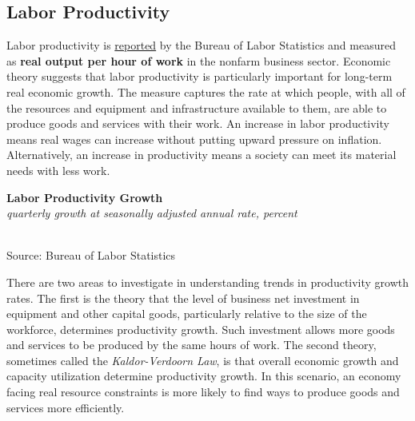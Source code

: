 \documentclass{report}
\makeatletter
\newcommand{\tbllink}[1]{\href{https://raw.githubusercontent.com/bdecon/US-chartbook/master/chartbook/data/#1}{\faTable}}
\newcommand*\short[1]{\expandafter\@gobbletwo\number\numexpr#1\relax}
\newcommand{\sbar}[4]{
		\addplot[ybar stacked, bar width=2.4pt, draw opacity=0, fill=#1] 
			table [x=#2, y=#3, col sep=comma]{#4};}
\newcommand{\dateaxisticks}{
		date coordinates in=x, axis line style={draw=none},
		xmax={2022-01-30},
		max space between ticks=40,	    
		xtick={{1990-01-01}, {1992-01-01}, {1994-01-01}, 
			{1996-01-01}, {1998-01-01}, {2000-01-01}, 
			{2002-01-01}, {2004-01-01}, {2006-01-01},
			{2008-01-01}, {2010-01-01}, {2012-01-01}, {2014-01-01},
		    {2016-01-01}, {2018-01-01}, {2020-01-01}, {2022-01-01}},
		minor xtick={{1989-01-01}, {1991-01-01}, {1993-01-01},
			{1995-01-01}, {1997-01-01}, {1999-01-01}, 
			{2001-01-01}, {2003-01-01}, {2005-01-01}, {2007-01-01},
		    {2009-01-01}, {2011-01-01}, {2013-01-01}, {2015-01-01},
		    {2017-01-01}, {2019-01-01}, {2021-01-01}},
		enlarge y limits={0.06}, enlarge x limits={0.01},
		}
\newcommand{\bbar}[2]{extra #1 ticks = {{#2}}, extra #1 tick labels = ,
		extra #1 tick style = {grid=major, grid style={thick, black!25}},}
\newcommand{\rbars}{
		\fill[color=black!10] (axis cs:{1990-07-01},\pgfkeysvalueof{/pgfplots/ymin}) rectangle 
			(axis cs:{1991-03-01}, \pgfkeysvalueof{/pgfplots/ymax});
		\fill[color=black!10] (axis cs:{2007-12-01},\pgfkeysvalueof{/pgfplots/ymin}) rectangle 
			(axis cs:{2009-07-01}, \pgfkeysvalueof{/pgfplots/ymax});
		\fill[color=black!10] (axis cs:{2001-03-01},\pgfkeysvalueof{/pgfplots/ymin}) rectangle 
			(axis cs:{2001-11-01}, \pgfkeysvalueof{/pgfplots/ymax});
		\fill[color=black!10] (axis cs:{2020-02-01},\pgfkeysvalueof{/pgfplots/ymin}) rectangle 
			(axis cs:{2020-05-01}, \pgfkeysvalueof{/pgfplots/ymax});}
\makeatother
\begin{document}
{{\begin{minipage}{0.76\textwidth}
\subsection*{\color{black!70} \seriffont Labor Productivity}
\small Labor productivity is \href{https://www.bls.gov/news.release/prod2.nr0.htm}{reported} by the Bureau of Labor Statistics and measured as \textbf{real output per hour of work} in the nonfarm business sector. Economic theory suggests that labor productivity is particularly important for long-term real economic growth. The measure captures the rate at which people, with all of the resources and equipment and infrastructure available to them, are able to produce goods and services with their work. An increase in labor productivity means real wages can increase without putting upward pressure on inflation. Alternatively, an increase in productivity means a society can meet its material needs with less work.


\vspace{3mm}

\normalsize \textbf{Labor Productivity Growth}\\
\footnotesize{\textit{quarterly growth at seasonally adjusted annual rate, percent}}\\
\hspace*{-2mm} \\
\footnotesize{Source: Bureau of Labor Statistics} \hfill \tbllink{lprod.csv}
\vspace{3mm}

\small There are two areas to investigate in understanding trends in productivity growth rates. The first is the theory that the level of business net investment in equipment and other capital goods, particularly relative to the size of the workforce, determines productivity growth. Such investment allows more goods and services to be produced by the same hours of work. The second theory, sometimes called the \textit{Kaldor-Verdoorn Law}, is that overall economic growth and capacity utilization determine productivity growth. In this scenario, an economy facing real resource constraints is more likely to find ways to produce goods and services more efficiently.
\end{minipage}
\newpage
\begin{minipage}{0.76\textwidth}

\end{minipage}}}
\end{document}
